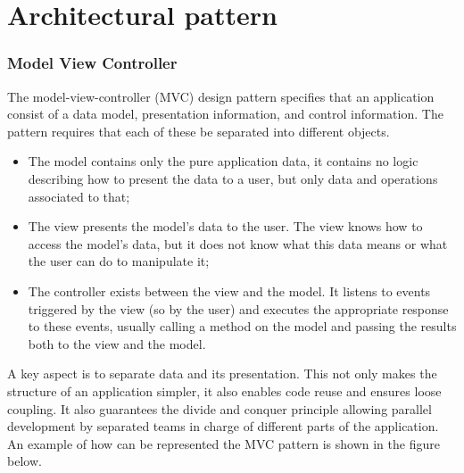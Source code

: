 \section{Architectural pattern}
\subsubsection{Model View Controller}
The model-view-controller (MVC) design pattern specifies that an application consist of a data model, presentation information, and control information. The pattern requires that each of these be separated into different objects.
\begin{itemize}

\item	The model contains only the pure application data, it contains no logic describing how to present the data to a user, but only data and operations associated to that;
\item	The view presents the model's data to the user. The view knows how to access the model's data, but it does not know what this data means or what the user can do to manipulate it;
\item	The controller exists between the view and the model. It listens to events triggered by the view (so by the user) and executes the appropriate response to these events, usually calling a method on the model and passing the results both to the view and the model.
\end{itemize}
A key aspect is to separate data and its presentation. This not only makes the structure of an application simpler, it also enables code reuse and ensures loose coupling.
It also guarantees the divide and conquer principle allowing parallel development by separated teams in charge of different parts of the application.
\\
An example of how can be represented the MVC pattern is shown in the figure below.

\begin{center}
\end{center}

